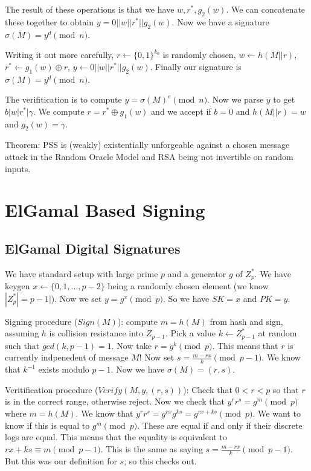 \documentclass[psamsfonts]{amsart}
\begin{document}
The result of these operations is that we have $w, r^*, g_2(w)$. We can concatenate these together to obtain $y = 0 || w || r^* || g_2(w)$. Now we have a signature $\sigma(M) = y^d \pmod{n}$.

Writing it out more carefully, $r \leftarrow \{0,1\}^{k_0}$ is randomly chosen, $w \leftarrow h(M || r)$, $r^* \leftarrow g_1(w) \oplus r$, $y \leftarrow 0 || w || r^* || g_2(w)$. Finally our signature is $\sigma(M) = y^d \pmod{n}$.

The verifitication is to compute $y = \sigma(M)^e \pmod{n}$. Now we parse $y$ to get $b | w | r^* | \gamma$. We compute $r = r^* \oplus g_1(w)$ and we accept if $b = 0$ and $h(M || r) = w$ and $g_2(w) = \gamma$.

Theorem: PSS is (weakly) existentially unforgeable against a chosen message attack in the Random Oracle Model and RSA being not invertible on random inputs.

\section{ElGamal Based Signing}

\subsection{ElGamal Digital Signatures}

We have standard setup with large prime $p$ and a generator $g$ of $Z_p^*$. We have keygen $x \leftarrow \{0, 1, \ldots, p-2\}$ being a randomly chosen element (we know $|Z_p^*| = p-1|$). Now we set $y = g^x \pmod{p}$. So we have $SK = x$ and $PK = y$.

Signing procedure ($Sign(M)$): compute $m = h(M)$ from hash and sign, assuming $h$ is collision resistance into $Z_{p-1}$. Pick a value $k \leftarrow Z_{p-1}^*$ at random such that $gcd(k, p-1) = 1$. Now take $r = g^k \pmod{p}$. This means that $r$ is currently indpenedent of message $M$! Now set $s = \frac{m - rx}{k} \pmod{p-1}$. We know that $k^{-1}$ exists modulo $p-1$. Now we have $\sigma(M) = (r,s)$.

Veritification procedure ($Verify(M, y, (r,s))$): Check that $0 < r < p$ so that $r$ is in the correct range, otherwise reject. Now we check that $y^r r^s = g^m \pmod{p}$ where $m = h(M)$. We know that $y^r r^s = g^{rx} g^{ks} = g^{rx + ks} \pmod{p}$. We want to know if this is equal to $g^m \pmod{p}$. These are equal if and only if their discrete logs are equal. This means that the equality is equivalent to $rx + ks \equiv m \pmod{p-1}$. This is the same as saying $s = \frac{m-rx}{k} \pmod{p-1}$. But this was our definition for $s$, so this checks out.
\end{document}
